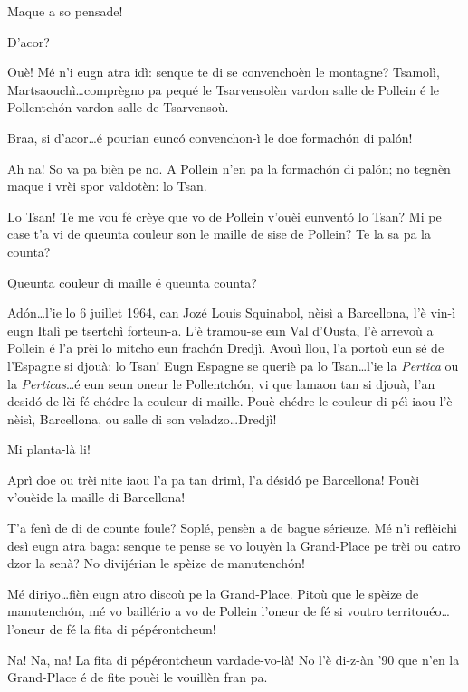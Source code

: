 \begin{drama}
\Taniaspeaks Maque a so pensade!

\Laurentspeaks D'acor?

\Taniaspeaks Ouè! Mé n'i eugn atra idì: senque te di se convenchoèn le montagne? Tsamolì, Martsaouchì\ldots comprègno pa pequé le Tsarvensolèn vardon salle de Pollein é le Pollentch\'on vardon salle de Tsarvensoù.

\Laurentspeaks Braa, si d'acor\ldots é pourian eunc\'o convenchon-ì le doe formach\'on di pal\'on!

\Taniaspeaks Ah na! So va pa bièn pe no. A Pollein n'en pa la formach\'on di pal\'on; no tegnèn maque i vrèi spor valdotèn: lo Tsan.

\Laurentspeaks Lo Tsan! Te me vou fé crèye que vo de Pollein v'ouèi eunvent\'o lo Tsan? Mi pe case t'a vi de queunta couleur son le maille de sise de Pollein? Te la sa pa la counta?

\Taniaspeaks Queunta couleur di maille é queunta counta?

\Laurentspeaks Ad\'on\ldots l'ie lo 6 juillet 1964, can Jozé Louis Squinabol, nèisì a Barcellona, l'è vin-ì eugn Italì pe tsertchì forteun-a. L'è tramou-se eun Val d'Ousta, l'è arrevoù a Pollein é l'a prèi lo mitcho eun frach\'on Dredjì. Avouì llou, l'a portoù eun sé de l'Espagne si djouà: lo Tsan! Eugn Espagne se queriè pa lo Tsan\ldots l'ie la \textit{Pertica} ou la \textit{Perticas}\ldots é eun seun oneur le Pollentch\'on, vi que lamaon tan si djouà, l'an desid\'o de lèi fé chédre la couleur di maille. Pouè chédre le couleur di péì iaou l'è nèisì, Barcellona, ou salle di son veladzo\ldots Dredjì!

\Taniaspeaks Mi planta-là li!

\Laurentspeaks Aprì doe ou trèi nite iaou l'a pa tan drimì, l'a désid\'o pe Barcellona! Pouèi v'ouèide la maille di Barcellona!

\Taniaspeaks{} T'a fenì de di de counte foule? Soplé, pensèn a de bague sérieuze. Mé n'i reflèichì desì eugn atra baga: senque te pense se vo louyèn la Grand-Place pe trèi ou catro dzor la senà? No divijérian le spèize de manutench\'on!

\Laurentspeaks{} Mé diriyo\ldots fièn eugn atro discoù pe la Grand-Place. Pitoù que le spèize de manutench\'on, mé vo baillério a vo de Pollein l'oneur de fé si voutro territouéo\ldots l'oneur de fé la fita di pépérontcheun!

\Taniaspeaks Na! Na, na! La fita di pépérontcheun vardade-vo-là! No l'è di-z-àn '90 que n'en la Grand-Place é de fite pouèi le vouillèn fran pa.


\end{drama}
